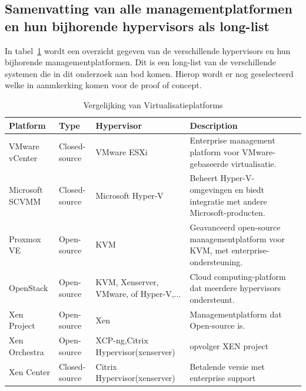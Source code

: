 \subsection{Samenvatting van alle managementplatformen en hun bijhorende hypervisors als long-list}\label{subsec:samenvatting}
In tabel~\ref{tab:longlist} wordt een overzicht gegeven van de verschillende hypervisors en hun bijhorende managementplatformen. Dit is een long-list van de verschillende systemen die in dit onderzoek aan bod komen. Hierop wordt er nog geselecteerd welke in aanmkerking komen voor de proof of concept.

    \begin{table}[h!]
        \centering
        \small
        \begin{tabular}{|p{2cm}|p{2cm}|p{3cm}|p{7cm}|p{7cm}|}
        \hline
        \textbf{Platform}      & \textbf{Type}      & \textbf{Hypervisor} & \textbf{Description} \\ \hline
        VMware vCenter         & Closed-source      & VMware ESXi         & Enterprise management platform voor VMware-gebaseerde virtualisatie. \\ \hline
        Microsoft SCVMM        & Closed-source      & Microsoft Hyper-V   & Beheert Hyper-V-omgevingen en biedt integratie met andere Microsoft-producten. \\ \hline
        Proxmox VE             & Open-source        & KVM                 & Geavanceerd open-source managementplatform voor KVM, met enterprise-ondersteuning. \\ \hline
        OpenStack              & Open-source        & KVM, Xenserver, VMware, of Hyper-V,...  & Cloud computing-platform dat meerdere hypervisors ondersteunt. \\ \hline
        Xen Project            & Open-source        & Xen                 & Managementplatform dat Open-source is. \\ \hline
        Xen Orchestra  & Open-source & XCP-ng,Citrix Hypervisor(xenserver)  & opvolger XEN project \\ \hline
        Xen Center  & Closed-source & Citrix Hypervisor(xenserver)   &  Betalende versie met enterprise support\\ 
        \end{tabular}
        \caption{Vergelijking van Virtualisatieplatforms}
        \label{tab:longlist}        
        \end{table}
\clearpage        
